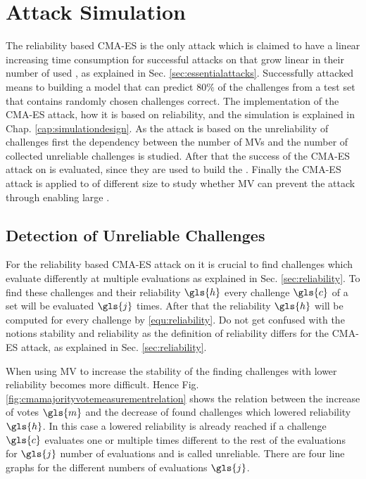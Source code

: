 \chapter{Attack Simulation}
\label{cap:attacksimulations}


The reliability based \ac{CMA-ES} is the only attack which is claimed to have a linear increasing time consumption for successful attacks on \xpufs that grow linear in their number of used \apufs, as explained in Sec. \ref{sec:essentialattacks}.
Successfully attacked means to building a model that can predict $80 \%$ of the challenges from a test set that contains randomly chosen challenges correct.
The implementation of the \ac{CMA-ES} attack, how it is based on reliability, and the \apuf simulation is explained in Chap. \ref{cap:simulationdesign}.
As the attack is based on the unreliability of challenges first the dependency between the number of \acp{MV} and the number of collected unreliable challenges is studied.
After that the success of the \ac{CMA-ES} attack on \mpufs is evaluated, since they are used to build the \mxpuf.
Finally the \ac{CMA-ES} attack is applied to \mxpufs of different size to study whether \ac{MV} can prevent the attack through enabling large \mxpufs. 


\section{Detection of Unreliable Challenges}
\label{sec:detectionofunreliablechallenges}

For the reliability based \ac{CMA-ES} attack on \apufs it is crucial to find challenges which evaluate differently at multiple evaluations as explained in Sec. \ref{sec:reliability}.
To find these challenges and their reliability $\gls{h}$ every challenge $\gls{c}$ of a set will be evaluated $\gls{j}$ times.
After that the reliability $\gls{h}$ will be computed for every challenge by \ref{equ:reliability}.
Do not get confused with the notions stability and reliability as the definition of reliability differs for the \ac{CMA-ES} attack, as explained in Sec. \ref{sec:reliability}.

When using \ac{MV} to increase the stability of the \apuf finding challenges with lower reliability becomes more difficult.
Hence Fig. \ref{fig:cmamajorityvotemeasurementrelation} shows the relation between the increase of votes $\gls{m}$ and the decrease of found challenges which lowered reliability $\gls{h}$.
In this case a lowered reliability is already reached if a challenge $\gls{c}$ evaluates one or multiple times different to the rest of the evaluations for $\gls{j}$ number of evaluations and is called unreliable. %
There are four line graphs for the different numbers of evaluations $\gls{j}$.

